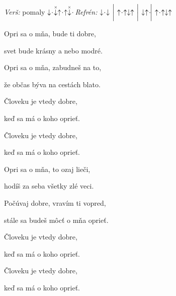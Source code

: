 \begin{song}


 \quad
\textit{Verš:} pomaly $\downarrow\hspace{-0.5ex}\cdot\hspace{-0.5ex}\stackrel{\scriptscriptstyle\times}{\downarrow}\uparrow\hspace{-0.5ex}\cdot\hspace{-0.5ex}\uparrow\stackrel{\scriptscriptstyle\times}{\downarrow}\hspace{-0.5ex}\cdot\hspace{-0.5ex}$ \quad
\textit{Refrén:} $\Down\Miss\Down \Separator \Up\Miss\Up\Down\Up \Separator \Down\Up\Miss \Separator \Up\Miss\Up\Down\Up$

\large


\Large

\bigskip

 Opri sa o mňa,  bude ti dobre, \par
{} svet bude krásny  a nebo modré. \par

\bigskip

 Opri sa o mňa,  zabudneš na to, \par
{} že občas býva na cestách blato. \par

\bigskip

  \par
Človeku je vtedy dobre,   \par
keď sa má o koho oprieť.  \par
Človeku je vtedy dobre,   \par
keď sa má o koho oprieť.  \par

\bigskip

 Opri sa o mňa,  to ozaj lieči, \par
{} hodíš za seba všetky zlé veci. \par

\bigskip

 Počúvaj dobre,  vravím ti vopred, \par
{} stále sa budeš môcť o mňa oprieť. \par

\bigskip

  \par
Človeku je vtedy dobre,   \par
keď sa má o koho oprieť.  \par
Človeku je vtedy dobre,   \par
keď sa má o koho oprieť.  \par


\end{song}
